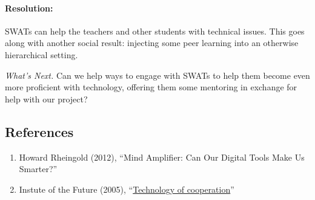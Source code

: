 \paragraph{Resolution:} SWATs can help the teachers and other students
with technical issues.  This goes along with another social result:
injecting some peer learning into an otherwise hierarchical setting.

\begin{framed}
\noindent 
\emph{What's Next.}  Can we help ways to engage with SWATs to help
them become even more proficient with technology, offering them some
mentoring in exchange for help with our project?
\end{framed}    


\subsection{References}

\begin{enumerate}
\item
  Howard Rheingold (2012), ``Mind Amplifier: Can Our Digital Tools Make
  Us Smarter?''
\item
  Instute of the Future (2005), ``\href{http://www.rheingold.com/cooperation/Technology_of_cooperation.pdf}{Technology of cooperation}''
\end{enumerate}

